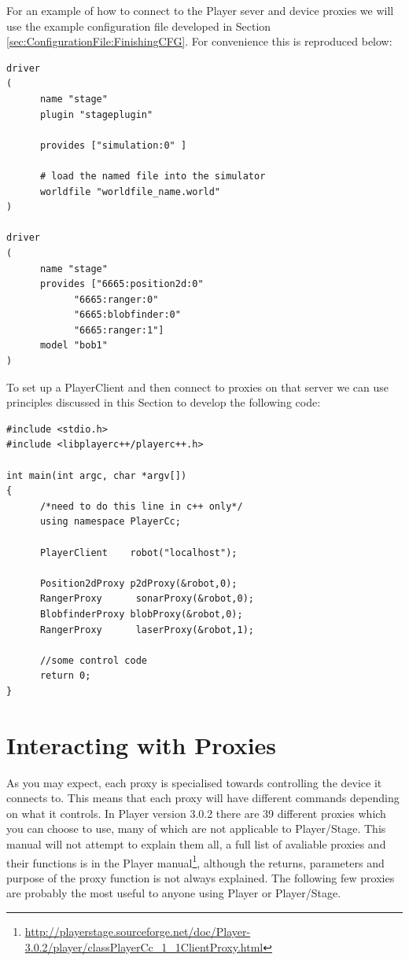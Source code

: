\documentclass[a4paper]{report}
\newcommand{\plst}{Player/Stage\xspace}
\newcommand{\pl}{Player\xspace}
\begin{document}
For an example of how to connect to the \pl sever and device proxies we will use the example configuration file developed in Section \ref{sec:ConfigurationFile:FinishingCFG}. For convenience this is reproduced below:
\begin{verbatim}
driver
(		
      name "stage"
      plugin "stageplugin"

      provides ["simulation:0" ]

      # load the named file into the simulator
      worldfile "worldfile_name.world"	
)      

driver
(
      name "stage"
      provides ["6665:position2d:0" 
            "6665:ranger:0" 
            "6665:blobfinder:0" 
            "6665:ranger:1"]
      model "bob1" 
)
\end{verbatim}
To set up a PlayerClient and then connect to proxies on that server we can use principles discussed in this Section to develop the following code:
\begin{verbatim}
#include <stdio.h>
#include <libplayerc++/playerc++.h>

int main(int argc, char *argv[])
{
      /*need to do this line in c++ only*/
      using namespace PlayerCc;
	
      PlayerClient    robot("localhost");

      Position2dProxy p2dProxy(&robot,0);
      RangerProxy      sonarProxy(&robot,0);
      BlobfinderProxy blobProxy(&robot,0);
      RangerProxy      laserProxy(&robot,1);

      //some control code
      return 0;
}
\end{verbatim}

\section{Interacting with Proxies}\label{sec:Coding:InteractingWithProxies}

As you may expect, each proxy is specialised towards controlling the device it connects to. This means that each proxy will have different commands depending on what it controls. 
In Player version 3.0.2 there are 39 different proxies which you can choose to use, many of which are not applicable to \plst. This manual will not attempt to explain them all, a full list of avaliable proxies and their functions is in the \pl manual\footnote{\url{http://playerstage.sourceforge.net/doc/Player-3.0.2/player/classPlayerCc\_1\_1ClientProxy.html}}, although the returns, parameters and purpose of the proxy function is not always explained. 
\newline The following few proxies are probably the most useful to anyone using \pl or \plst.
\end{document}
